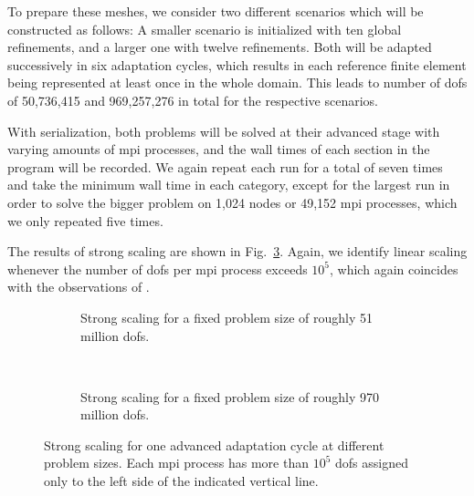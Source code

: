 To prepare these meshes, we consider two different scenarios which will be constructed as follows: A smaller scenario is initialized with ten global refinements, and a larger one with twelve refinements. Both will be adapted successively in six adaptation cycles, which results in each reference finite element being represented at least once in the whole domain. This leads to number of \glspl{dof} of 50,736,415 and 969,257,276 in total for the respective scenarios.

With serialization, both problems will be solved at their advanced stage with varying amounts of \gls{mpi} processes, and the wall times of each section in the program will be recorded. We again repeat each run for a total of seven times and take the minimum wall time in each category, except for the largest run in order to solve the bigger problem on 1,024 nodes or 49,152 \gls{mpi} processes, which we only repeated five times. %

The results of strong scaling are shown in Fig.~\ref{fig:strong}.
Again, we identify linear scaling whenever the number of \glspl{dof} per \gls{mpi} process exceeds $10^5$, which again coincides with the observations of \textcite{bangerth2012}.

\begin{figure}
\begin{subfigure}{1\textwidth}
  \centering
  
  \caption{Strong scaling for a fixed problem size of roughly 51 million \glspl{dof}.}
  \label{fig:strong-nrefs10}
\end{subfigure} \\
\vspace{1em}
\begin{subfigure}{1\textwidth}
  \centering
  
  \caption{Strong scaling for a fixed problem size of roughly 970 million \glspl{dof}.}
  \label{fig:strong-nrefs12}
\end{subfigure}
\caption[Strong scaling for one advanced adaptation cycle at different problem sizes.]{Strong scaling for one advanced adaptation cycle at different problem sizes. Each \gls{mpi} process has more than $10^5$ \glspl{dof} assigned only to the left side of the indicated vertical line.}
\label{fig:strong}
\end{figure}